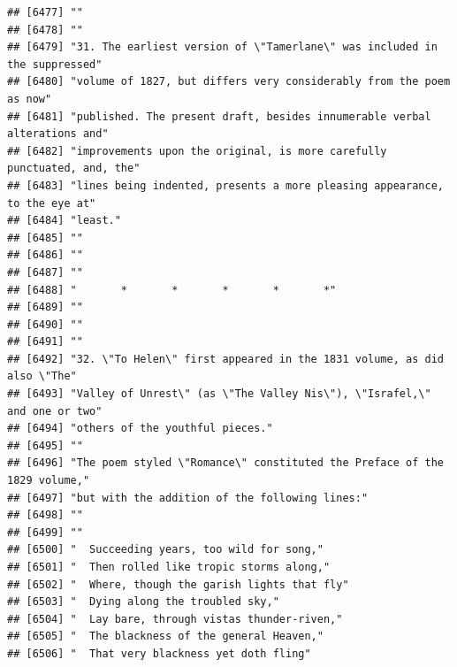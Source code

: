 \documentclass{article}\usepackage[]{graphicx}\usepackage[]{color}
\makeatletter
\newenvironment{kframe}{%
 \def\at@end@of@kframe{}%
 \ifinner\ifhmode%
  \def\at@end@of@kframe{\end{minipage}}%
  \begin{minipage}{\columnwidth}%
 \fi\fi%
 \def\FrameCommand##1{\hskip\@totalleftmargin \hskip-\fboxsep
 \colorbox{shadecolor}{##1}\hskip-\fboxsep
     \hskip-\linewidth \hskip-\@totalleftmargin \hskip\columnwidth}%
 \MakeFramed {\advance\hsize-\width
   \@totalleftmargin\z@ \linewidth\hsize
   \@setminipage}}%
 {\par\unskip\endMakeFramed%
 \at@end@of@kframe}
\newenvironment{knitrout}{}{} %
\makeatother
\begin{document}
\begin{knitrout}
\begin{kframe}
\begin{verbatim}
## [6477] ""                                                                            
## [6478] ""                                                                            
## [6479] "31. The earliest version of \"Tamerlane\" was included in the suppressed"    
## [6480] "volume of 1827, but differs very considerably from the poem as now"          
## [6481] "published. The present draft, besides innumerable verbal alterations and"    
## [6482] "improvements upon the original, is more carefully punctuated, and, the"      
## [6483] "lines being indented, presents a more pleasing appearance, to the eye at"    
## [6484] "least."                                                                      
## [6485] ""                                                                            
## [6486] ""                                                                            
## [6487] ""                                                                            
## [6488] "       *       *       *       *       *"                                    
## [6489] ""                                                                            
## [6490] ""                                                                            
## [6491] ""                                                                            
## [6492] "32. \"To Helen\" first appeared in the 1831 volume, as did also \"The"       
## [6493] "Valley of Unrest\" (as \"The Valley Nis\"), \"Israfel,\" and one or two"     
## [6494] "others of the youthful pieces."                                              
## [6495] ""                                                                            
## [6496] "The poem styled \"Romance\" constituted the Preface of the 1829 volume,"     
## [6497] "but with the addition of the following lines:"                               
## [6498] ""                                                                            
## [6499] ""                                                                            
## [6500] "  Succeeding years, too wild for song,"                                      
## [6501] "  Then rolled like tropic storms along,"                                     
## [6502] "  Where, though the garish lights that fly"                                  
## [6503] "  Dying along the troubled sky,"                                             
## [6504] "  Lay bare, through vistas thunder-riven,"                                   
## [6505] "  The blackness of the general Heaven,"                                      
## [6506] "  That very blackness yet doth fling"                                        

\end{verbatim}
\end{kframe}
\end{knitrout}
\end{document}
